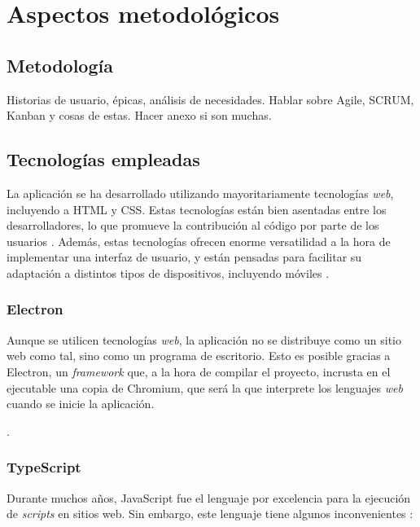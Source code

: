 \chapter{Aspectos metodológicos}  

\section{Metodología}

Historias de usuario, épicas, análisis de necesidades. Hablar sobre Agile, SCRUM, Kanban y cosas de estas.
Hacer anexo si son muchas.

\section{Tecnologías empleadas}

La aplicación se ha desarrollado utilizando mayoritariamente tecnologías \textit{web}, incluyendo a HTML y CSS. Estas tecnologías están bien asentadas entre los desarrolladores, lo que promueve la contribución al código por parte de los usuarios \citationNeeded. Además, estas tecnologías ofrecen enorme versatilidad a la hora de implementar una interfaz de usuario, y están pensadas para facilitar su adaptación a distintos tipos de dispositivos, incluyendo móviles \citationNeeded.

\subsection{Electron}

Aunque se utilicen tecnologías \textit{web}, la aplicación no se distribuye como un sitio web como tal, sino como un programa de escritorio. Esto es posible gracias a Electron, un \textit{framework} que, a la hora de compilar el proyecto, incrusta en el ejecutable una copia de Chromium, que será la que interprete los lenguajes \textit{web} cuando se inicie la aplicación. \citationNeeded

.

\subsection{TypeScript}

Durante muchos años, JavaScript fue el lenguaje por excelencia para la ejecución de \textit{scripts} en sitios web. Sin embargo, este lenguaje tiene algunos inconvenientes \autocite{10.1007/978-3-662-44202-9_11}:

